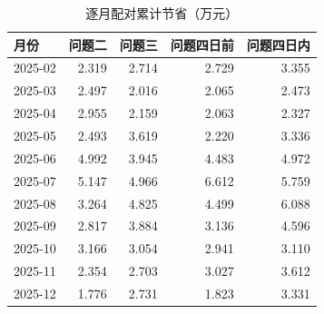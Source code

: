 \begin{table}[htbp]\centering\small
\caption{逐月配对累计节省（万元）}
\begin{tabular}{lrrrr}
\toprule
月份 & 问题二 & 问题三 & 问题四日前 & 问题四日内 \\
\midrule
2025-02 & 2.319 & 2.714 & 2.729 & 3.355 \\
2025-03 & 2.497 & 2.016 & 2.065 & 2.473 \\
2025-04 & 2.955 & 2.159 & 2.063 & 2.327 \\
2025-05 & 2.493 & 3.619 & 2.220 & 3.336 \\
2025-06 & 4.992 & 3.945 & 4.483 & 4.972 \\
2025-07 & 5.147 & 4.966 & 6.612 & 5.759 \\
2025-08 & 3.264 & 4.825 & 4.499 & 6.088 \\
2025-09 & 2.817 & 3.884 & 3.136 & 4.596 \\
2025-10 & 3.166 & 3.054 & 2.941 & 3.110 \\
2025-11 & 2.354 & 2.703 & 3.027 & 3.612 \\
2025-12 & 1.776 & 2.731 & 1.823 & 3.331 \\
\bottomrule\end{tabular}\end{table}
